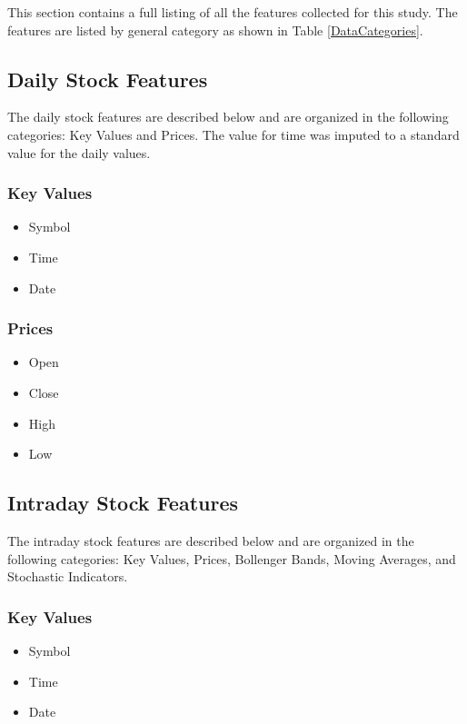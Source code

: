\documentclass[journal]{IEEEtran}
\begin{document}
This section contains a full listing of all the features collected for this
 study. The features are listed by general category as shown in 
 Table \ref{DataCategories}.

\subsection{Daily Stock Features}

The daily stock features are described below and are organized in the
 following categories: Key Values and Prices.
The value for time was imputed to a standard value for the daily values.

\subsubsection{Key Values}

\begin{itemize}
	\item Symbol
	\item Time
	\item Date
\end{itemize}

\subsubsection{Prices}

\begin{itemize}
	\item Open
	\item Close
	\item High
	\item Low
\end{itemize}

\subsection{Intraday Stock Features}

The intraday stock features are described below and are organized in the 
 following categories: Key Values, Prices, Bollenger Bands, Moving Averages, and
  Stochastic Indicators.

\subsubsection{Key Values}

\begin{itemize}
	\item Symbol
	\item Time
	\item Date
\end{itemize}
\end{document}
